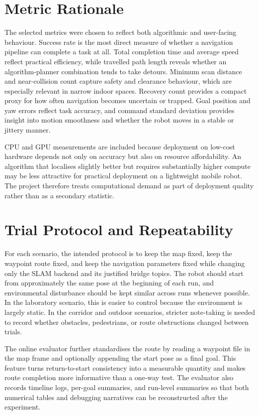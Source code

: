 \documentclass[12pt,a4paper]{report}
\begin{document}
\section{Metric Rationale}
The selected metrics were chosen to reflect both algorithmic and user-facing behaviour. Success rate is the most direct measure of whether a navigation pipeline can complete a task at all. Total completion time and average speed reflect practical efficiency, while travelled path length reveals whether an algorithm-planner combination tends to take detours. Minimum scan distance and near-collision count capture safety and clearance behaviour, which are especially relevant in narrow indoor spaces. Recovery count provides a compact proxy for how often navigation becomes uncertain or trapped. Goal position and yaw errors reflect task accuracy, and command standard deviation provides insight into motion smoothness and whether the robot moves in a stable or jittery manner.

CPU and GPU measurements are included because deployment on low-cost hardware depends not only on accuracy but also on resource affordability. An algorithm that localises slightly better but requires substantially higher compute may be less attractive for practical deployment on a lightweight mobile robot. The project therefore treats computational demand as part of deployment quality rather than as a secondary statistic.

\section{Trial Protocol and Repeatability}
For each scenario, the intended protocol is to keep the map fixed, keep the waypoint route fixed, and keep the navigation parameters fixed while changing only the SLAM backend and its justified bridge topics. The robot should start from approximately the same pose at the beginning of each run, and environmental disturbance should be kept similar across runs whenever possible. In the laboratory scenario, this is easier to control because the environment is largely static. In the corridor and outdoor scenarios, stricter note-taking is needed to record whether obstacles, pedestrians, or route obstructions changed between trials.

The online evaluator further standardises the route by reading a waypoint file in the map frame and optionally appending the start pose as a final goal. This feature turns return-to-start consistency into a measurable quantity and makes route completion more informative than a one-way test. The evaluator also records timeline logs, per-goal summaries, and run-level summaries so that both numerical tables and debugging narratives can be reconstructed after the experiment.
\end{document}
